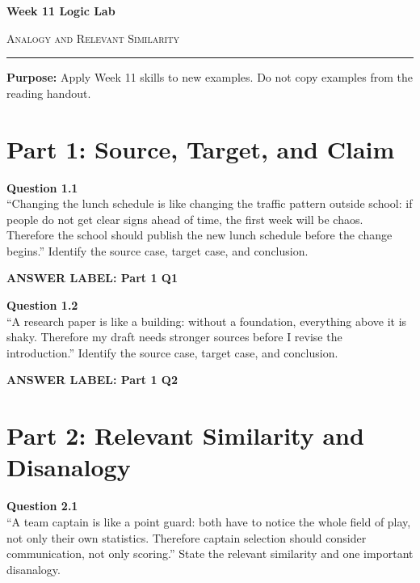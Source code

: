 \documentclass[12pt]{article}
\newcommand{\answerbox}[2]{%
\vspace{0.15em}
\noindent\textbf{#1}\par
\vspace{0.05em}
\noindent\fbox{%
\begin{minipage}[t][#2]{\dimexpr\textwidth-2\fboxsep-2\fboxrule}
\rule{\textwidth}{0pt}
\vspace{#2}
\end{minipage}
}\par
\vspace{0.25em}
}
\begin{document}
\begin{center}
{\LARGE\bfseries Week 11 Logic Lab}\par\vspace{0.05em}
{\large\scshape Analogy and Relevant Similarity}\par\vspace{0.1em}
\rule{0.78\textwidth}{0.5pt}\par\vspace{0.15em}
\end{center}

\noindent\textbf{Purpose:} Apply Week 11 skills to new examples. Do not copy examples from the reading handout.

\vspace{0.3em}

\section*{Part 1: Source, Target, and Claim}

\textbf{Question 1.1}\\[-0.15em]
``Changing the lunch schedule is like changing the traffic pattern outside school: if people do not get clear signs ahead of time, the first week will be chaos. Therefore the school should publish the new lunch schedule before the change begins.'' Identify the source case, target case, and conclusion.

\answerbox{ANSWER LABEL: Part 1 Q1}{2.35in}

\textbf{Question 1.2}\\[-0.15em]
``A research paper is like a building: without a foundation, everything above it is shaky. Therefore my draft needs stronger sources before I revise the introduction.'' Identify the source case, target case, and conclusion.

\answerbox{ANSWER LABEL: Part 1 Q2}{2.35in}

\newpage

\section*{Part 2: Relevant Similarity and Disanalogy}

\textbf{Question 2.1}\\[-0.15em]
``A team captain is like a point guard: both have to notice the whole field of play, not only their own statistics. Therefore captain selection should consider communication, not only scoring.'' State the relevant similarity and one important disanalogy.
\end{document}
